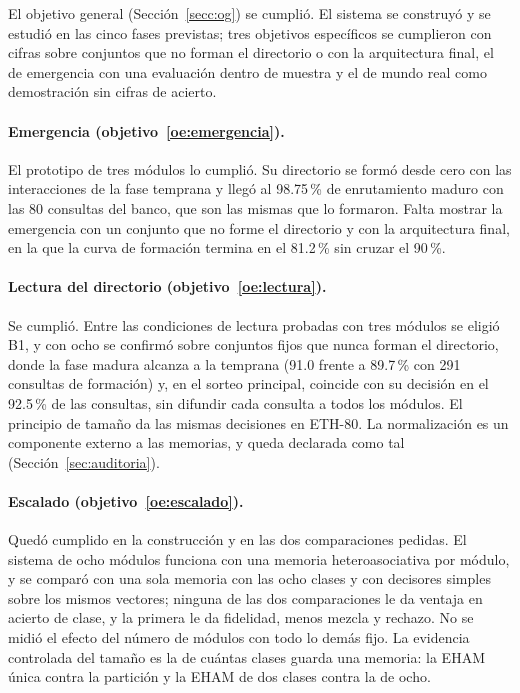 El objetivo general (Sección~\ref{secc:og}) se cumplió.
El sistema se construyó y se estudió en las cinco fases previstas; tres objetivos
específicos se cumplieron con cifras sobre conjuntos que no forman el directorio o con la
arquitectura final, el de emergencia con una evaluación dentro de muestra y el de mundo
real como demostración sin cifras de acierto.

\paragraph{Emergencia (objetivo~\ref{oe:emergencia}).}
El prototipo de tres módulos lo cumplió.
Su directorio se formó desde cero con las interacciones de la fase temprana y llegó al
98.75\,\% de enrutamiento maduro con las 80 consultas del banco, que son las mismas que
lo formaron.
Falta mostrar la emergencia con un conjunto que no forme el directorio y con la
arquitectura final, en la que la curva de formación termina en el 81.2\,\% sin cruzar el
90\,\%.

\paragraph{Lectura del directorio (objetivo~\ref{oe:lectura}).}
Se cumplió.
Entre las condiciones de lectura probadas con tres módulos se eligió B1, y con ocho se
confirmó sobre conjuntos fijos que nunca forman el directorio, donde la fase madura
alcanza a la temprana (91.0 frente a 89.7\,\% con 291 consultas de formación) y, en el
sorteo principal, coincide con su decisión en el 92.5\,\% de las consultas, sin difundir
cada consulta a todos los módulos.
El principio de tamaño da las mismas decisiones en ETH-80.
La normalización es un componente externo a las memorias, y queda declarada como tal
(Sección~\ref{sec:auditoria}).

\paragraph{Escalado (objetivo~\ref{oe:escalado}).}
Quedó cumplido en la construcción y en las dos comparaciones pedidas.
El sistema de ocho módulos funciona con una memoria heteroasociativa por módulo, y se
comparó con una sola memoria con las ocho clases y con decisores simples sobre los mismos
vectores; ninguna de las dos comparaciones le da ventaja en acierto de clase, y la
primera le da fidelidad, menos mezcla y rechazo.
No se midió el efecto del número de módulos con todo lo demás fijo.
La evidencia controlada del tamaño es la de cuántas clases guarda una memoria: la EHAM
única contra la partición y la EHAM de dos clases contra la de ocho.

